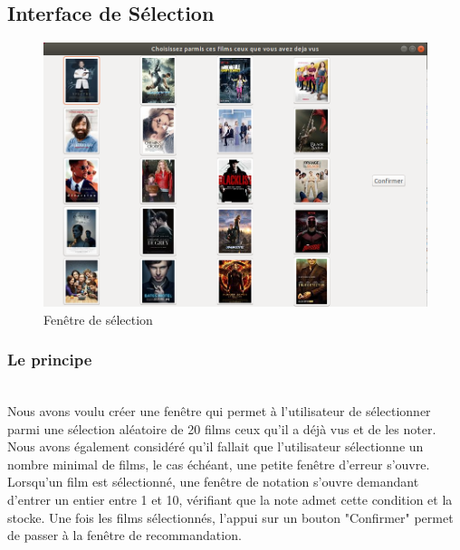 \documentclass{article}
\begin{document}
\subsection{Interface de Sélection}

\begin{figure}[h]
    \centering
    \includegraphics[scale=0.4]{InterfaceSelection.png}
    \caption{Fenêtre de sélection}
    \label{SMART}
\end{figure}

\subsubsection{Le principe}

\noindent
\\ Nous avons voulu créer une fenêtre qui permet à l'utilisateur de sélectionner parmi une sélection aléatoire de 20 films ceux qu'il a déjà vus et de les noter. Nous avons également considéré qu'il fallait que l'utilisateur sélectionne un nombre minimal de films, le cas échéant, une petite fenêtre d'erreur s'ouvre. Lorsqu'un film est sélectionné, une fenêtre de notation s'ouvre demandant d'entrer un entier entre 1 et 10, vérifiant que la note admet cette condition et la stocke. Une fois les films sélectionnés, l'appui sur un bouton "Confirmer" permet de passer à la fenêtre de recommandation.
\end{document}
